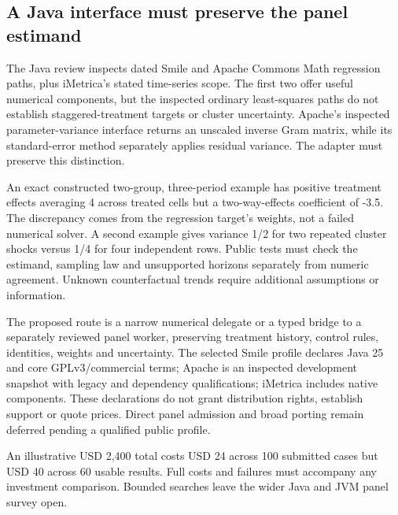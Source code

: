 \hypertarget{a-java-interface-must-preserve-the-panel-estimand}{%
\subsection{A Java interface must preserve the panel
estimand}\label{a-java-interface-must-preserve-the-panel-estimand}}

The Java review inspects dated Smile and Apache Commons Math regression
paths, plus iMetrica's stated time-series scope. The first two offer
useful numerical components, but the inspected ordinary least-squares
paths do not establish staggered-treatment targets or cluster
uncertainty. Apache's inspected parameter-variance interface returns an
unscaled inverse Gram matrix, while its standard-error method separately
applies residual variance. The adapter must preserve this distinction.
\citep{exec25_paneljava_smile,exec25_paneljava_commons,exec25_paneljava_imetrica}

An exact constructed two-group, three-period example has positive
treatment effects averaging 4 across treated cells but a two-way-effects
coefficient of -3.5. The discrepancy comes from the regression target's
weights, not a failed numerical solver. A second example gives variance
1/2 for two repeated cluster shocks versus 1/4 for four independent
rows. Public tests must check the estimand, sampling law and unsupported
horizons separately from numeric agreement. Unknown counterfactual
trends require additional assumptions or information.
\citep{exec25_paneljava_reference}

The proposed route is a narrow numerical delegate or a typed bridge to a
separately reviewed panel worker, preserving treatment history, control
rules, identities, weights and uncertainty. The selected Smile profile
declares Java 25 and core GPLv3/commercial terms; Apache is an inspected
development snapshot with legacy and dependency qualifications; iMetrica
includes native components. These declarations do not grant distribution
rights, establish support or quote prices. Direct panel admission and
broad porting remain deferred pending a qualified public profile.
\citep{exec25_paneljava_smile,exec25_paneljava_commons,exec25_paneljava_imetrica}

An illustrative USD 2,400 total costs USD 24 across 100 submitted cases
but USD 40 across 60 usable results. Full costs and failures must
accompany any investment comparison. Bounded searches leave the wider
Java and JVM panel survey open. \citep{exec25_paneljava_reference}

